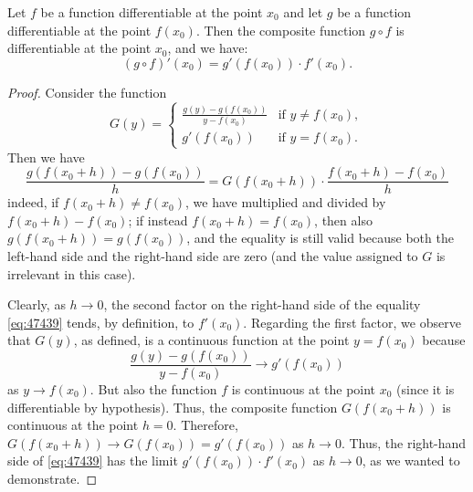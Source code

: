 \begin{theorem}
\mymark{**}%
Let $f$ be a function differentiable at the point $x_0$
and let $g$ be a function differentiable at the point $f(x_0)$.
Then the composite function $g\circ f$ is differentiable
at the point $x_0$, and we have:
\[
  (g\circ f)'(x_0) = g'(f(x_0))\cdot f'(x_0).
\]
\end{theorem}
%
\begin{proof}
\mymark{**}
Consider the function
\[
  G(y) =
  \begin{cases}
   \frac{g(y) - g(f(x_0))}{y-f(x_0)} & \text{if $y \neq f(x_0)$},\\
   g'(f(x_0)) & \text{if $y=f(x_0)$}.
  \end{cases}
\]
Then we have
\begin{equation}\label{eq:47439}
 \frac{g(f(x_0+h))-g(f(x_0))}{h}
 = G(f(x_0+h)) \cdot \frac{f(x_0+h)-f(x_0)}{h}
\end{equation}
indeed, if $f(x_0+h)\neq f(x_0)$, we have multiplied and divided
by $f(x_0+h) - f(x_0)$; if instead $f(x_0+h)=f(x_0)$, then also
$g(f(x_0+h))=g(f(x_0))$, and the equality is still valid because both the
left-hand side and the right-hand side are zero (and the value assigned to $G$
is irrelevant in this case).

Clearly, as $h\to 0$, the second factor on the right-hand side
of the equality \eqref{eq:47439}
tends, by definition, to $f'(x_0)$.
Regarding the first factor,
we observe that $G(y)$, as defined, is a continuous function at the point
$y=f(x_0)$ because
\[
\frac{g(y) - g(f(x_0))}{y-f(x_0)} \to g'(f(x_0))
\]
as $y\to f(x_0)$.
But also the function $f$ is continuous at the point $x_0$ (since it is
differentiable by hypothesis).
Thus, the composite function $G(f(x_0+h))$ is continuous at the point $h=0$.
Therefore, $G(f(x_0+h)) \to G(f(x_0)) = g'(f(x_0))$ as $h\to 0$.
Thus, the right-hand side of \eqref{eq:47439} has the limit $g'(f(x_0)) \cdot
f'(x_0)$ as $h\to 0$, as we wanted to demonstrate.
\end{proof}


